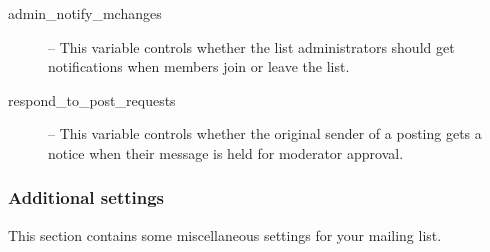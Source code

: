 \documentclass{howto}
\begin{document}
\begin{description}
\item[admin_notify_mchanges] --
    This variable controls whether the list administrators should get
    notifications when members join or leave the list.

\item[respond_to_post_requests] --
    This variable controls whether the original sender of a posting
    gets a notice when their message is held for moderator approval.

\end{description}

\subsubsection{Additional settings}

This section contains some miscellaneous settings for your mailing
list.
\end{document}
